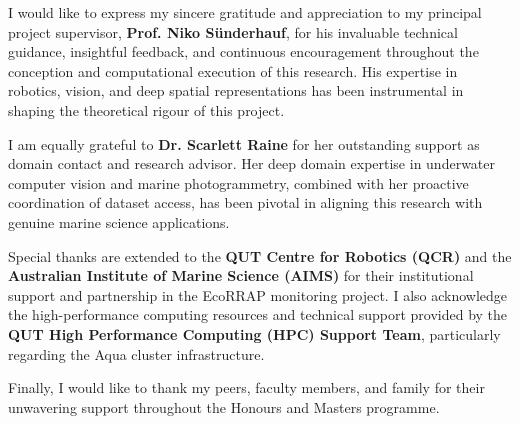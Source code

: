 
I would like to express my sincere gratitude and appreciation to my principal project supervisor, \textbf{Prof. Niko S{\"u}nderhauf}, for his invaluable technical guidance, insightful feedback, and continuous encouragement throughout the conception and computational execution of this research. His expertise in robotics, vision, and deep spatial representations has been instrumental in shaping the theoretical rigour of this project.

I am equally grateful to \textbf{Dr. Scarlett Raine} for her outstanding support as domain contact and research advisor. Her deep domain expertise in underwater computer vision and marine photogrammetry, combined with her proactive coordination of dataset access, has been pivotal in aligning this research with genuine marine science applications.

Special thanks are extended to the \textbf{QUT Centre for Robotics (QCR)} and the \textbf{Australian Institute of Marine Science (AIMS)} for their institutional support and partnership in the EcoRRAP monitoring project. I also acknowledge the high-performance computing resources and technical support provided by the \textbf{QUT High Performance Computing (HPC) Support Team}, particularly regarding the Aqua cluster infrastructure.

Finally, I would like to thank my peers, faculty members, and family for their unwavering support throughout the Honours and Masters programme.
